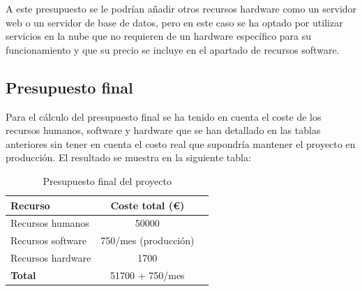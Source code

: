 A este presupuesto se le podrían añadir otros recursos hardware como un servidor web o un servidor de base de datos,
pero en este caso se ha optado por utilizar servicios en la nube que no requieren de un hardware específico para su
funcionamiento y que su precio se incluye en el apartado de recursos software.

\subsection{Presupuesto final}\label{subsec:presupuesto-final}

Para el cálculo del presupuesto final se ha tenido en cuenta el coste de los recursos humanos, software y hardware que
se han detallado en las tablas anteriores sin tener en cuenta el costo real que supondría mantener el proyecto en producción.
El resultado se muestra en la siguiente tabla: \\

\begin{table}[h]
    \centering
    \begin{tabular}{|l|c|c|}
        \hline
        \textbf{Recurso} & \textbf{Coste total (€)} \\ \hline
        Recursos humanos & 50000 \\ \hline
        Recursos software & 750/mes (producción) \\ \hline
        Recursos hardware & 1700 \\ \hline
        \hline
        \textbf{Total} & 51700 + 750/mes \\ \hline
    \end{tabular}
    \caption{Presupuesto final del proyecto}
    \label{tab:tabla_presupuesto_final}
\end{table}